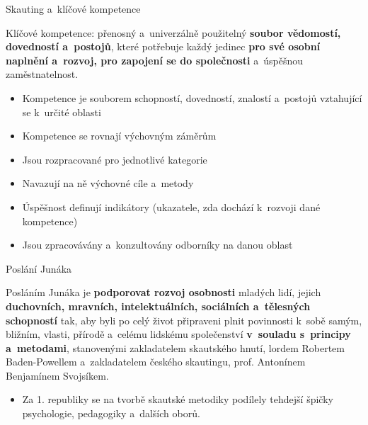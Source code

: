 \documentclass[compress,xelatex,xcolor=dvipsnames,print]{beamer}
\begin{document}
\begin{frame}{Skauting a~klíčové kompetence}
\begin{center}
Klíčové kompetence: přenosný a~univerzálně použitelný \textbf{soubor vědomostí, dovedností a~postojů}, které potřebuje každý jedinec \textbf{pro své osobní naplnění a~rozvoj, pro zapojení se do společnosti} a~úspěšnou zaměstnatelnost.
\end{center}
\begin{itemize}
\item Kompetence je souborem schopností, dovedností, znalostí a~postojů vztahující se k~určité oblasti
\item Kompetence se rovnají výchovným záměrům
\item Jsou rozpracované pro jednotlivé kategorie
\item Navazují na ně výchovné cíle a~metody
\item Úspěšnost definují indikátory (ukazatele, zda dochází k~rozvoji dané kompetence)
\item Jsou zpracovávány a~konzultovány odborníky na danou oblast
\end{itemize}
\end{frame}

\begin{frame}{Poslání Junáka}
\begin{center}
\begin{Large}
Posláním Junáka je \textbf{podporovat rozvoj osobnosti} mladých lidí, jejich \textbf{duchovních, mravních, intelektuálních, sociálních a~tělesných schopností} tak, aby byli po celý život připraveni plnit povinnosti k~sobě samým, bližním, vlasti, přírodě a~celému lidskému společenství \textbf{v~souladu s~principy a~metodami}, stanovenými zakladatelem skautského hnutí, lordem Robertem Baden-Powellem a~zakladatelem českého skautingu, prof. Antonínem Benjamínem Svojsíkem.
\end{Large}
\end{center}
\begin{itemize}
\item Za 1. republiky se na tvorbě skautské metodiky podílely tehdejší špičky psychologie, pedagogiky a~dalších oborů.
\end{itemize}
\end{frame}
\end{document}
